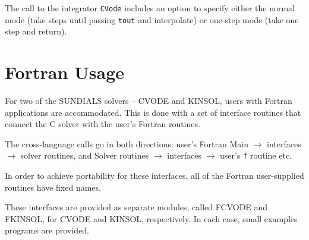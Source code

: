The call to the integrator {\tt CVode} includes an option to specify
either the normal mode (take steps until passing {\tt tout} and
interpolate) or one-step mode (take one step and return).


\section{Fortran Usage}

For two of the SUNDIALS solvers -- CVODE and KINSOL, users with
Fortran applications are accommodated.  This is done with a set of
interface routines that connect the C solver with the user's Fortran
routines.

The cross-language calls go in both directions:
\newline \hspace*{.5in} user's Fortran Main $\longrightarrow$
interfaces $\longrightarrow$ solver routines, and
\newline \hspace*{.5in} Solver routines $\longrightarrow$ interfaces
$\longrightarrow$ user's {\tt f} routine etc.

In order to achieve portability for these interfaces, all of the
Fortran user-supplied routines have fixed names.

These interfaces are provided as separate modules, called FCVODE and
FKINSOL, for CVODE and KINSOL, respectively.  In each case, small
examples programs are provided.


